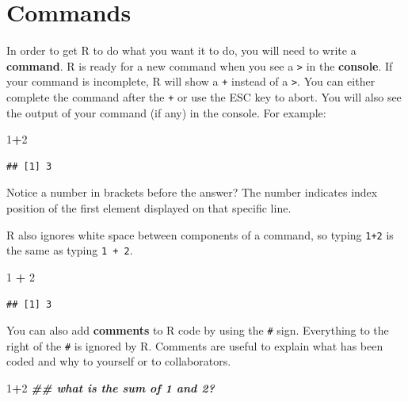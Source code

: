 \documentclass[
]{book}
\newenvironment{Shaded}{\begin{snugshade}}{\end{snugshade}}
\newcommand{\DecValTok}[1]{\textcolor[rgb]{0.00,0.00,0.81}{#1}}
\newcommand{\DocumentationTok}[1]{\textcolor[rgb]{0.56,0.35,0.01}{\textbf{\textit{#1}}}}
\newcommand{\SpecialCharTok}[1]{\textcolor[rgb]{0.81,0.36,0.00}{\textbf{#1}}}
\theoremstyle{definition}
\theoremstyle{definition}
\theoremstyle{definition}
\theoremstyle{definition}
\theoremstyle{remark}
\begin{document}
\hypertarget{commands}{%
\section{Commands}\label{commands}}

In order to get R to do what you want it to do, you will need to write a \textbf{command}. R is ready for a new command when you see a \texttt{\textgreater{}} in the \textbf{console}. If your command is incomplete, R will show a \texttt{+} instead of a \texttt{\textgreater{}}. You can either complete the command after the \texttt{+} or use the ESC key to abort. You will also see the output of your command (if any) in the console. For example:

\begin{Shaded}
\begin{Highlighting}[]
\DecValTok{1}\SpecialCharTok{+}\DecValTok{2}
\end{Highlighting}
\end{Shaded}

\begin{verbatim}
## [1] 3
\end{verbatim}

Notice a number in brackets before the answer? The number indicates index position of the first element displayed on that specific line.

R also ignores white space between components of a command, so typing \texttt{1+2} is the same as typing \texttt{1\ +\ 2}.

\begin{Shaded}
\begin{Highlighting}[]
\DecValTok{1} \SpecialCharTok{+} \DecValTok{2}
\end{Highlighting}
\end{Shaded}

\begin{verbatim}
## [1] 3
\end{verbatim}

You can also add \textbf{comments} to R code by using the \texttt{\#} sign. Everything to the right of the \texttt{\#} is ignored by R. Comments are useful to explain what has been coded and why to yourself or to collaborators.

\begin{Shaded}
\begin{Highlighting}[]
\DecValTok{1}\SpecialCharTok{+}\DecValTok{2} \DocumentationTok{\#\# what is the sum of 1 and 2?}
\end{Highlighting}
\end{Shaded}
\end{document}
